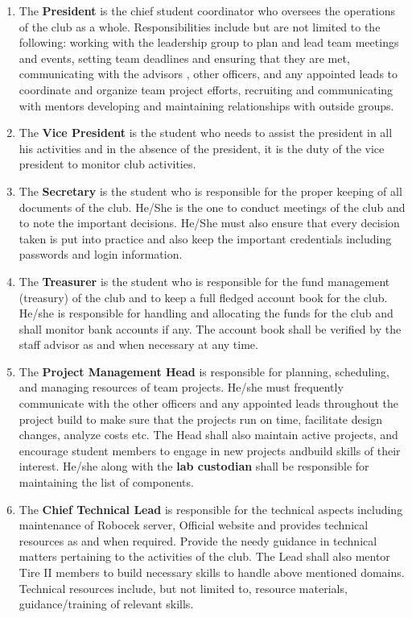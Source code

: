\begin{enumerate}
	\item The \textbf{President} is the chief student coordinator who oversees the
operations of the club as a whole. Responsibilities include but are not
	limited to the following: working with the leadership group to plan and lead
team meetings and events, setting team deadlines and ensuring that they
are met, communicating with the advisors , other officers, and any
appointed leads to coordinate and organize team project efforts, recruiting
and communicating with mentors developing and maintaining relationships
with outside groups.
	
	\item The \textbf{Vice President} is the student who needs to assist the president in all
his activities and in the absence of the president, it is the duty of the vice
president to monitor club activities.
	
	\item The \textbf{Secretary} is the student who is responsible for the proper keeping of
all documents of the club. He/She is the one to conduct meetings of the
club and to note the important decisions. He/She must also ensure that
every decision taken is put into practice and also keep the important
credentials including passwords and login information.
	
	\item The \textbf{Treasurer} is the student who is responsible for the fund management
(treasury) of the club and to keep a full fledged account book for the club.
He/she is responsible for handling and allocating the funds for the club
and shall monitor bank accounts if any. The account book shall be verified
by the staff advisor as and when necessary at any time.
	
	\item The \textbf{Project Management Head} is responsible for planning, scheduling,
and managing resources of team projects. He/she must frequently
communicate with the other officers and any appointed leads throughout
the project build to make sure that the projects run on time, facilitate
design changes, analyze costs etc. The Head shall also maintain active
projects, and encourage student members to engage in new projects andbuild skills of their interest. He/she along with the \textbf{lab custodian} shall be
responsible for maintaining the list of components.
	
	\item The \textbf{Chief Technical Lead} is responsible for the technical aspects
including maintenance of Robocek server, Official website and provides
technical resources as and when required. Provide the needy guidance in
technical matters pertaining to the activities of the club. The Lead shall
also mentor Tire II members to build necessary skills to handle above
mentioned domains. Technical resources include, but not limited to,
resource materials, guidance/training of relevant skills.
	

\end{enumerate}
